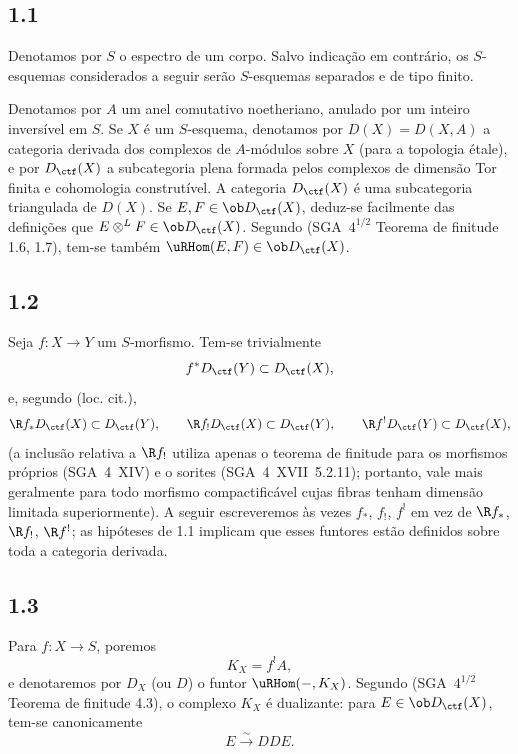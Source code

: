 \subsection*{1.1}
Denotamos por $S$ o espectro de um corpo. Salvo indicação em contrário, os $S$-esquemas considerados a seguir serão $S$-esquemas separados e de tipo finito.

Denotamos por $A$ um anel comutativo noetheriano, anulado por um inteiro inversível em $S$. Se $X$ é um $S$-esquema, denotamos por $D(X)=D(X,A)$ a categoria derivada dos complexos de $A$-módulos sobre $X$ (para a topologia étale), e por $D_{\ctf}(X)$ a subcategoria plena formada pelos complexos de dimensão Tor finita e cohomologia construtível. A categoria $D_{\ctf}(X)$ é uma subcategoria triangulada de $D(X)$. Se $E,F \in \ob D_{\ctf}(X)$, deduz-se facilmente das definições que $E \otimes^{L} F \in \ob D_{\ctf}(X)$. Segundo (SGA~$4^{1/2}$ Teorema de finitude 1.6, 1.7), tem-se também $\uRHom(E,F) \in \ob D_{\ctf}(X)$.

\subsection*{1.2}
Seja $f:X\to Y$ um $S$-morfismo. Tem-se trivialmente
\[
f^{*}D_{\ctf}(Y) \subset D_{\ctf}(X),
\]
e, segundo (loc. cit.),
\[
\R f_{*}D_{\ctf}(X) \subset D_{\ctf}(Y),\qquad
\R f_{!}D_{\ctf}(X) \subset D_{\ctf}(Y),\qquad
\R f^{!}D_{\ctf}(Y) \subset D_{\ctf}(X),
\]
(a inclusão relativa a $\R f_{!}$ utiliza apenas o teorema de finitude para os morfismos próprios (SGA~4~XIV) e o sorites (SGA~4~XVII~5.2.11); portanto, vale mais geralmente para todo morfismo compactificável cujas fibras tenham dimensão limitada superiormente). A seguir escreveremos às vezes $f_{*}$, $f_{!}$, $f^{!}$ em vez de $\R f_{*}$, $\R f_{!}$, $\R f^{!}$; as hipóteses de 1.1 implicam que esses funtores estão definidos sobre toda a categoria derivada.

\subsection*{1.3}
Para $f:X\to S$, poremos
\[
K_X=f^{!}A,
\]
e denotaremos por $D_X$ (ou $D$) o funtor $\uRHom(-,K_X)$. Segundo (SGA~$4^{1/2}$ Teorema de finitude 4.3), o complexo $K_X$ é dualizante: para $E\in\ob D_{\ctf}(X)$, tem-se canonicamente
\[
E \xrightarrow{\sim} DDE.
\]

